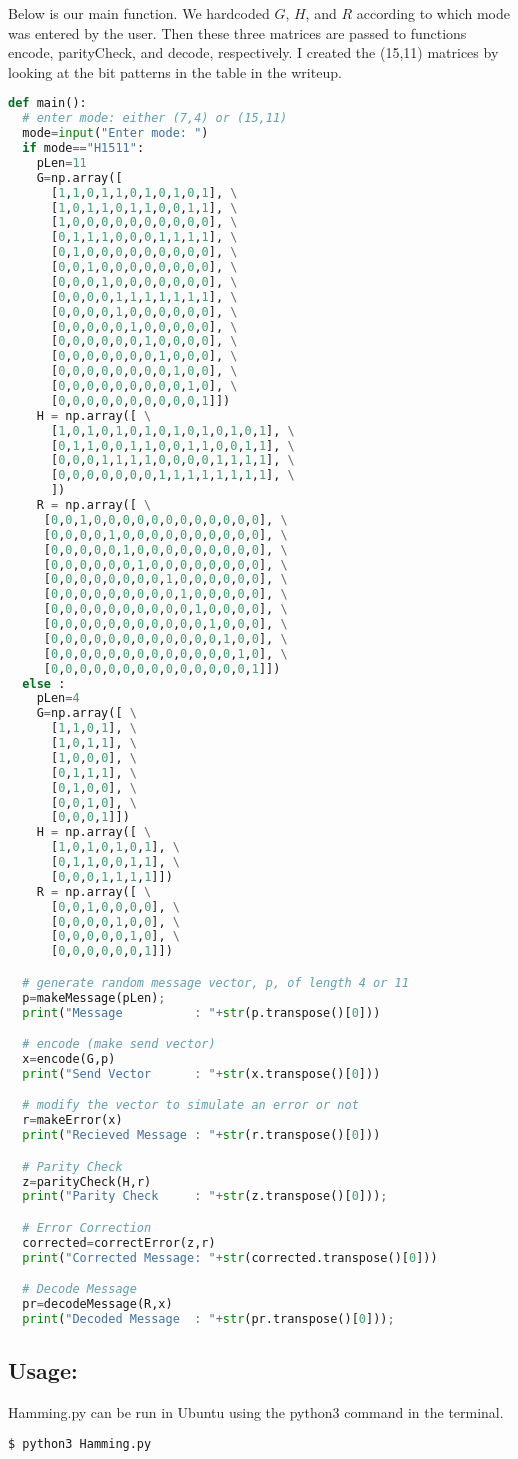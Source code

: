 \documentclass[12pt]{article}
\begin{document}
Below is our main function. We hardcoded $G$, $H$, and $R$ according to 
which mode was entered by the user. Then these three matrices are passed to functions 
encode, parityCheck, and decode, respectively. I created the (15,11) matrices by 
looking at the bit patterns in the table in the writeup.
\begin{lstlisting}[frame=single,language=Python,caption=main \label{code:makeMessage}]
def main():
  # enter mode: either (7,4) or (15,11)
  mode=input("Enter mode: ")
  if mode=="H1511": 
    pLen=11
    G=np.array([
      [1,1,0,1,1,0,1,0,1,0,1], \
      [1,0,1,1,0,1,1,0,0,1,1], \
      [1,0,0,0,0,0,0,0,0,0,0], \
      [0,1,1,1,0,0,0,1,1,1,1], \
      [0,1,0,0,0,0,0,0,0,0,0], \
      [0,0,1,0,0,0,0,0,0,0,0], \
      [0,0,0,1,0,0,0,0,0,0,0], \
      [0,0,0,0,1,1,1,1,1,1,1], \
      [0,0,0,0,1,0,0,0,0,0,0], \
      [0,0,0,0,0,1,0,0,0,0,0], \
      [0,0,0,0,0,0,1,0,0,0,0], \
      [0,0,0,0,0,0,0,1,0,0,0], \
      [0,0,0,0,0,0,0,0,1,0,0], \
      [0,0,0,0,0,0,0,0,0,1,0], \
      [0,0,0,0,0,0,0,0,0,0,1]])
    H = np.array([ \
      [1,0,1,0,1,0,1,0,1,0,1,0,1,0,1], \
      [0,1,1,0,0,1,1,0,0,1,1,0,0,1,1], \
      [0,0,0,1,1,1,1,0,0,0,0,1,1,1,1], \
      [0,0,0,0,0,0,0,1,1,1,1,1,1,1,1], \
      ])
    R = np.array([ \
     [0,0,1,0,0,0,0,0,0,0,0,0,0,0,0], \
     [0,0,0,0,1,0,0,0,0,0,0,0,0,0,0], \
     [0,0,0,0,0,1,0,0,0,0,0,0,0,0,0], \
     [0,0,0,0,0,0,1,0,0,0,0,0,0,0,0], \
     [0,0,0,0,0,0,0,0,1,0,0,0,0,0,0], \
     [0,0,0,0,0,0,0,0,0,1,0,0,0,0,0], \
     [0,0,0,0,0,0,0,0,0,0,1,0,0,0,0], \
     [0,0,0,0,0,0,0,0,0,0,0,1,0,0,0], \
     [0,0,0,0,0,0,0,0,0,0,0,0,1,0,0], \
     [0,0,0,0,0,0,0,0,0,0,0,0,0,1,0], \
     [0,0,0,0,0,0,0,0,0,0,0,0,0,0,1]])
  else : 
    pLen=4
    G=np.array([ \
      [1,1,0,1], \
      [1,0,1,1], \
      [1,0,0,0], \
      [0,1,1,1], \
      [0,1,0,0], \
      [0,0,1,0], \
      [0,0,0,1]])
    H = np.array([ \
      [1,0,1,0,1,0,1], \
      [0,1,1,0,0,1,1], \
      [0,0,0,1,1,1,1]])
    R = np.array([ \
      [0,0,1,0,0,0,0], \
      [0,0,0,0,1,0,0], \
      [0,0,0,0,0,1,0], \
      [0,0,0,0,0,0,1]])

  # generate random message vector, p, of length 4 or 11 
  p=makeMessage(pLen);
  print("Message          : "+str(p.transpose()[0]))

  # encode (make send vector)
  x=encode(G,p)
  print("Send Vector      : "+str(x.transpose()[0]))

  # modify the vector to simulate an error or not
  r=makeError(x)
  print("Recieved Message : "+str(r.transpose()[0]))

  # Parity Check
  z=parityCheck(H,r)
  print("Parity Check     : "+str(z.transpose()[0]));

  # Error Correction
  corrected=correctError(z,r)
  print("Corrected Message: "+str(corrected.transpose()[0]))

  # Decode Message 
  pr=decodeMessage(R,x)
  print("Decoded Message  : "+str(pr.transpose()[0]));
\end{lstlisting}

\subsection*{Usage:}
Hamming.py can be run in Ubuntu using the python3 command in the terminal. 

\begin{lstlisting}[frame=single,language=Python,caption=main \label{code:makeMessage}]
  $ python3 Hamming.py
\end{lstlisting}
\end{document}

